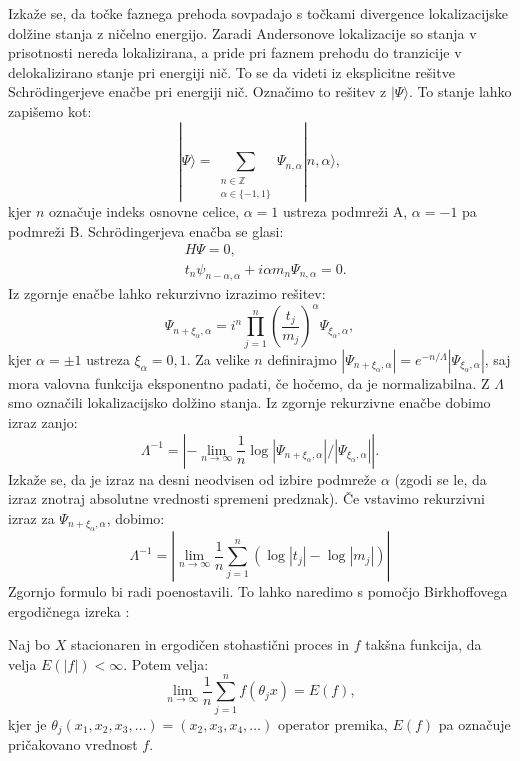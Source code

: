 Izkaže se, da točke faznega prehoda sovpadajo s točkami divergence lokalizacijske dolžine stanja z ničelno energijo. Zaradi Andersonove lokalizacije so stanja v prisotnosti nereda lokalizirana, a pride pri faznem prehodu do tranzicije v delokalizirano stanje pri energiji nič.
To se da videti iz eksplicitne rešitve Schrödingerjeve enačbe pri energiji nič. Označimo to rešitev z $|  \Psi \rangle$.
To stanje lahko zapišemo kot:
\begin{equation}
| \Psi \rangle = \sum_{\substack{n \in \mathbb{Z} \\ \alpha \in \{-1,1\}}} \Psi_{n, \alpha} |n, \alpha \rangle,
\end{equation}
kjer $n$ označuje indeks osnovne celice, $\alpha=1$ ustreza podmreži A, $\alpha=-1$ pa podmreži B.
Schrödingerjeva enačba se glasi:
\begin{align}
&H \Psi = 0, \\
&t_n \psi_{n-\alpha, \alpha} + i \alpha m_n \Psi_{n, \alpha} = 0.
\end{align}
Iz zgornje enačbe lahko rekurzivno izrazimo rešitev:
\begin{equation}
\Psi_{n+\xi_\alpha, \alpha} = i^n \prod_{j=1}^n \left( \frac{t_j}{m_j} \right)^\alpha \Psi_{\xi_\alpha,\alpha},
\end{equation}
kjer $\alpha = \pm 1$ ustreza $\xi_\alpha = 0, 1$.
Za velike $n$ definirajmo $|\Psi_{n+\xi_\alpha, \alpha}| = e^{-n/\Lambda } |\Psi_{\xi_\alpha, \alpha}|$, saj mora valovna funkcija eksponentno padati, če hočemo, da je normalizabilna. Z $\Lambda$ smo označili lokalizacijsko dolžino stanja.
Iz zgornje rekurzivne enačbe dobimo izraz zanjo:
\begin{equation}
\Lambda^{-1} = \left| - \lim_{n \to \infty} \frac{1}{n} \log |\Psi_{n+ \xi_\alpha, \alpha}| / |\Psi_{\xi_\alpha, \alpha}| \right|.
\end{equation}
Izkaže se, da je izraz na desni neodvisen od izbire podmreže $\alpha$ (zgodi se le, da izraz znotraj absolutne vrednosti spremeni predznak).
Če vstavimo rekurzivni izraz za $\Psi_{n+ \xi_\alpha, \alpha}$, dobimo:
\begin{equation} \label{empiricnalok}
\Lambda^{-1} = \left| \lim_{n \to \infty} \frac{1}{n} \sum_{j=1}^n ( \log |t_j| - \log |m_j| ) \right| 
\end{equation}
Zgornjo formulo bi radi poenostavili. 
To lahko naredimo s pomočjo Birkhoffovega ergodičnega izreka \cite{birkhoff}:
\begin{theorem*}
Naj bo $X$ stacionaren in ergodičen stohastični proces in $f$ takšna funkcija, da velja $E(|f|) < \infty$. Potem velja:
\begin{equation}
\lim_{n \to \infty} \frac{1}{n} \sum_{j=1}^{n} f(\theta_j x) = E(f),
\end{equation}
kjer je $\theta_j (x_1,x_2,x_3, \dots) = (x_2,x_3,x_4, \dots)$ operator premika, $E(f)$ pa označuje pričakovano vrednost $f$.
\end{theorem*}
